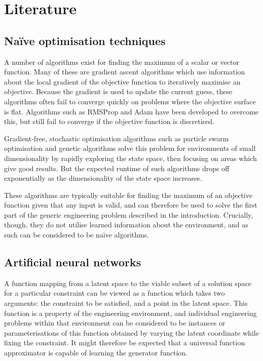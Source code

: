 \documentclass[../../main.tex]{subfiles}
\begin{document}
\chapter{Literature}

\section{Na\"{i}ve optimisation techniques}

A number of algorithms exist for finding the maximum of a scalar or vector function.
Many of these are gradient ascent algorithms \cite{ruder17} which use information about the local gradient of the objective function to iteratively maximise an objective.
Because the gradient is used to update the current guess, these algorithms often fail to converge quickly on problems where the objective surface is flat.
Algorithms such as RMSProp \cite{hinton17} and Adam \cite{kingma17} have been developed to overcome this, but still fail to converge if the objective function is discretised.

Gradient-free, stochastic optimisation algorithms such as particle swarm optimisation \cite{kennedy12} and genetic algorithms \cite{carr14} solve this problem for environments of small dimensionality by rapidly exploring the state space, then focusing on areas which give good results.
But the expected runtime of such algorithms drops off exponentially as the dimensionality of the state space increases.

These algorithms are typically suitable for finding the maximum of an objective function given that any input is valid, and can therefore be used to solve the first part of the generic engineering problem described in the introduction.
Crucially, though, they do not utilise learned information about the environment, and as such can be considered to be na\"{i}ve algorithms.

\section{Artificial neural networks}

A function mapping from a latent space to the viable subset of a solution space for a particular constraint can be viewed as a function which takes two arguments: the constraint to be satisfied, and a point in the latent space.
This function is a property of the engineering environment, and individual engineering problems within that environment can be considered to be instances or parameterisations of this function obtained by varying the latent coordinate while fixing the constraint.
It might therefore be expected that a universal function approximator is capable of learning the generator function.
\end{document}
